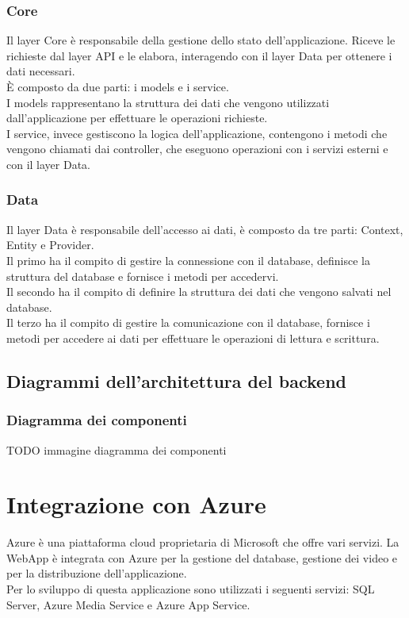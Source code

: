 \subsubsection{Core}
Il layer Core è responsabile della gestione dello stato dell'applicazione. Riceve le richieste dal layer API e le elabora, interagendo con il layer Data per ottenere i dati necessari.\\
È composto da due parti: i models e i service.\\
I models rappresentano la struttura dei dati che vengono utilizzati dall'applicazione per effettuare le operazioni richieste.\\
I service, invece gestiscono la logica dell'applicazione, contengono i metodi che vengono chiamati dai controller, che eseguono operazioni con i servizi esterni e con il layer Data.\\

\subsubsection{Data}
Il layer Data è responsabile dell'accesso ai dati, è composto da tre parti: Context, Entity e Provider.\\
Il primo ha il compito di gestire la connessione con il database, definisce la struttura del database e fornisce i metodi per accedervi.\\
Il secondo ha il compito di definire la struttura dei dati che vengono salvati nel database.\\
Il terzo ha il compito di gestire la comunicazione con il database, fornisce i metodi per accedere ai dati per effettuare le operazioni di lettura e scrittura.\\

\subsection{Diagrammi dell'architettura del backend}
\subsubsection{Diagramma dei componenti}

TODO immagine diagramma dei componenti

\section{Integrazione con Azure}
Azure è una piattaforma cloud proprietaria di Microsoft che offre vari servizi.
La WebApp è integrata con Azure per la gestione del database, gestione dei video e per la distribuzione dell'applicazione.\\
Per lo sviluppo di questa applicazione sono utilizzati i seguenti servizi: SQL Server, Azure Media Service e Azure App Service.\\

